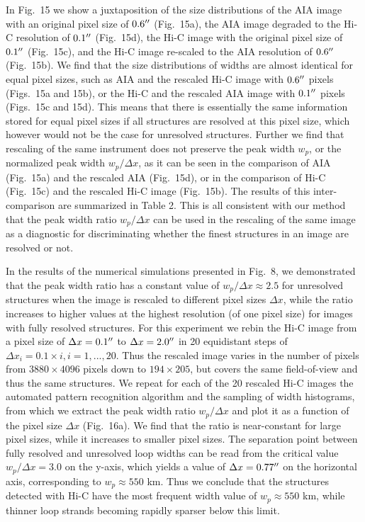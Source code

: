 \documentclass[10pt,preprint]{aastex}  %
\def\arcsec{\hbox{$^{\prime\prime}$}}
\begin{document}
In Fig.~15 we show a juxtaposition of the size distributions of
the AIA image with an original pixel size of $0.6\arcsec$ (Fig.~15a), 
the AIA image degraded to the Hi-C resolution of 
$0.1\arcsec$ (Fig.~15d), the Hi-C image with the original
pixel size of $0.1\arcsec$ (Fig.~15c), and the
Hi-C image re-scaled to the AIA resolution of $0.6\arcsec$
(Fig.~15b). We find that the size distributions of widths 
are almost identical for equal pixel sizes, such as AIA
and the rescaled Hi-C image with $0.6\arcsec$ pixels 
(Figs.~15a and 15b), or the Hi-C and the rescaled AIA image 
with $0.1\arcsec$ pixels (Figs.~15c and 15d). This means
that there is essentially the same information stored for
equal pixel sizes if all structures are resolved at this
pixel size, which however would not be the case for unresolved
structures. Further we find that rescaling of the same
instrument does not preserve the peak width $w_p$, or
the normalized peak width $w_p/\Delta x$, as it can be
seen in the comparison of AIA (Fig.~15a) and the rescaled
AIA (Fig.~15d), or in the comparison of Hi-C (Fig.~15c)
and the rescaled Hi-C image (Fig.~15b). The results of this
inter-comparison are summarized in Table 2. This is all
consistent with our method that the peak width ratio
$w_p/\Delta x$ can be used in the rescaling of the same image
as a diagnostic for discriminating whether the finest
structures in an image are resolved or not.

In the results of the numerical simulations presented
in Fig.~8, we demonstrated that the peak width
ratio has a constant value of $w_p/\Delta x \approx 2.5$ 
for unresolved structures when the image is rescaled to
different pixel sizes $\Delta x$, while the ratio increases 
to higher values at the highest resolution (of one pixel
size) for images with fully resolved structures.  
For this experiment we rebin the Hi-C image from a pixel
size of $\Delta x=0.1\arcsec$ to $\Delta x=2.0\arcsec$ 
in 20 equidistant steps of $\Delta x_i = 0.1 \times i, 
i=1,...,20$. Thus the rescaled image varies in the number
of pixels from $3880 \times 4096$ pixels down to 
$194 \times 205$, but covers the same field-of-view and
thus the same structures. We repeat for each of the 20
rescaled Hi-C images the automated pattern recognition
algorithm and the sampling of width histograms, from
which we extract the peak width ratio $w_p/\Delta x$
and plot it as a function of the pixel size $\Delta x$
(Fig.~16a). We find that the ratio is near-constant 
for large pixel sizes, while it increases to smaller
pixel sizes. The separation point between fully resolved
and unresolved loop widths can be read from the critical
value $w_p/\Delta x=3.0$ on the y-axis, which yields
a value of $\Delta x=0.77\arcsec$ on the horizontal
axis, corresponding to $w_p \approx 550$ km. Thus we 
conclude that the structures detected with Hi-C have 
the most frequent width value of $w_p\approx 550$ km, 
while thinner loop strands becoming rapidly sparser 
below this limit.
\end{document}

